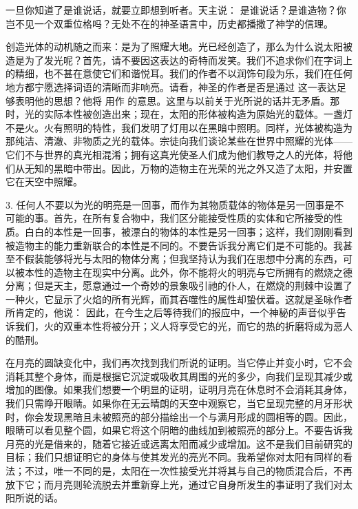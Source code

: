 一旦你知道了是谁说话，就要立即想到听者。天主说： 是谁说话？是谁造物？你岂不见一个双重位格吗？无处不在的神圣语言中，历史都播撒了神学的信理。\par

创造光体的动机随之而来：是为了照耀大地。光已经创造了，那么为什么说太阳被造是为了发光呢？首先，请不要因这表达的奇特而发笑。我们不追求你们在字词上的精细，也不甚在意使它们和谐悦耳。我们的作者不以润饰句段为乐，我们在任何地方都宁愿选择词语的清晰而非响亮。请看，神圣的作者是否是通过  这一表达足够表明他的思想？他将  用作  的意思。这里与以前关于光所说的话并无矛盾。那时，光的实际本性被创造出来；现在，太阳的形体被构造为原始光的载体。一盏灯不是火。火有照明的特性，我们发明了灯用以在黑暗中照明。同样，光体被构造为那纯洁、清澈、非物质之光的载体。宗徒向我们谈论某些在世界中照耀的光体——它们不与世界的真光相混淆；拥有这真光使圣人们成为他们教导之人的光体，将他们从无知的黑暗中带出。因此，万物的造物主在光荣的光之外又造了太阳，并安置它在天空中照耀。\par

3. 任何人不要以为光的明亮是一回事，而作为其物质载体的物体是另一回事是不可能的事。首先，在所有复合物中，我们区分能接受性质的实体和它所接受的性质。白白的本性是一回事，被漂白的物体的本性是另一回事；这样，我们刚刚看到被造物主的能力重新联合的本性是不同的。不要告诉我分离它们是不可能的。我甚至不假装能够将光与太阳的物体分离；但我坚持认为我们在思想中分离的东西，可以被本性的造物主在现实中分离。此外，你不能将火的明亮与它所拥有的燃烧之德分离；但是天主，愿意通过一个奇妙的景象吸引祂的仆人，在燃烧的荆棘中设置了一种火，它显示了火焰的所有光辉，而其吞噬性的属性却蛰伏着。这就是圣咏作者所肯定的，他说： 因此，在今生之后等待我们的报应中，一个神秘的声音似乎告诉我们，火的双重本性将被分开；义人将享受它的光，而它的热的折磨将成为恶人的酷刑。\par

在月亮的圆缺变化中，我们再次找到我们所说的证明。当它停止并变小时，它不会消耗其整个身体，而是根据它沉淀或吸收其周围的光的多少，向我们呈现其减少或增加的图像。如果我们想要一个明显的证明，证明月亮在休息时不会消耗其身体，我们只需睁开眼睛。如果你在无云晴朗的天空中观察它，当它呈现完整的月牙形状时，你会发现黑暗且未被照亮的部分描绘出一个与满月形成的圆相等的圆。因此，眼睛可以看见整个圆，如果它将这个阴暗的曲线加到被照亮的部分上。不要告诉我月亮的光是借来的，随着它接近或远离太阳而减少或增加。这不是我们目前研究的目标；我们只想证明它的身体与使其发光的亮光不同。我希望你对太阳有同样的看法；不过，唯一不同的是，太阳在一次性接受光并将其与自己的物质混合后，不再放下它；而月亮则轮流脱去并重新穿上光，通过它自身所发生的事证明了我们对太阳所说的话。\par

